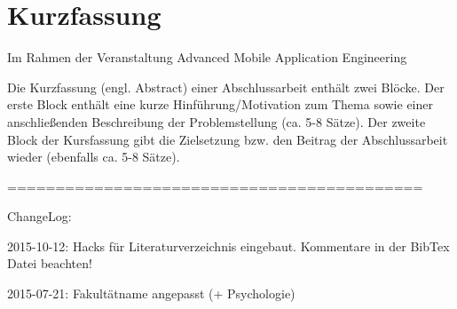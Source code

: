 \section*{Kurzfassung}
Im Rahmen der Veranstaltung Advanced Mobile Application Engineering 

Die Kurzfassung (engl. Abstract) einer Abschlussarbeit enthält zwei Blöcke. Der
erste Block enthält eine  kurze Hinführung/Motivation zum Thema sowie einer
anschließenden Beschreibung der Problemstellung (ca. 5-8 Sätze). Der zweite
Block der Kursfassung gibt die Zielsetzung bzw. den Beitrag der Abschlussarbeit
wieder (ebenfalls ca. 5-8 Sätze).

===========================================

ChangeLog:

2015-10-12: Hacks für Literaturverzeichnis eingebaut. Kommentare in der BibTex
Datei beachten!

2015-07-21: Fakultätname angepasst (+ Psychologie)


